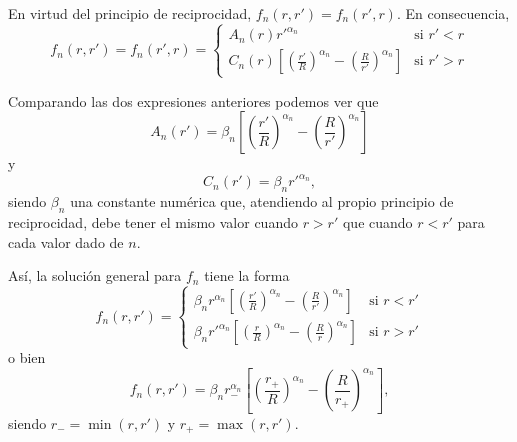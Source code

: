 \documentclass[12pt,a4paper]{book}
\begin{document}
En virtud del principio de reciprocidad, $f_n(r, r') = f_n(r', r)$. En consecuencia,
\begin{equation}
f_n(r, r') = f_n(r', r) = 
\begin{cases}
A_n(r)r'^{\alpha_n} & \text{si } r' < r \\
C_n(r)\left[\left(\frac{r'}{R}\right)^{\alpha_n} - \left(\frac{R}{r'}\right)^{\alpha_n}\right] & \text{si } r' > r
\end{cases}
\end{equation}

Comparando las dos expresiones anteriores podemos ver que
\begin{equation}
A_n(r') = \beta_n \left[\left(\frac{r'}{R}\right)^{\alpha_n} - \left(\frac{R}{r'}\right)^{\alpha_n}\right]
\end{equation}
y
\begin{equation}
C_n(r') = \beta_n r'^{\alpha_n},
\end{equation}
siendo $\beta_n$ una constante numérica que, atendiendo al propio principio de reciprocidad, debe tener el mismo valor cuando $r > r'$ que cuando $r < r'$ para cada valor dado de $n$.

Así, la solución general para $f_n$ tiene la forma
\begin{equation}
f_n(r, r') = 
\begin{cases}
\beta_n r^{\alpha_n}\left[\left(\frac{r'}{R}\right)^{\alpha_n} - \left(\frac{R}{r'}\right)^{\alpha_n}\right] & \text{si } r < r' \\
\beta_n r'^{\alpha_n}\left[\left(\frac{r}{R}\right)^{\alpha_n} - \left(\frac{R}{r}\right)^{\alpha_n}\right] & \text{si } r > r'
\end{cases}
\end{equation}
o bien
\begin{equation}
f_n(r, r') = \beta_n r_-^{\alpha_n} \left[\left(\frac{r_+}{R}\right)^{\alpha_n} - \left(\frac{R}{r_+}\right)^{\alpha_n}\right],
\end{equation}
siendo $r_- = \min(r, r')$ y $r_+ = \max(r, r')$.
\end{document}
